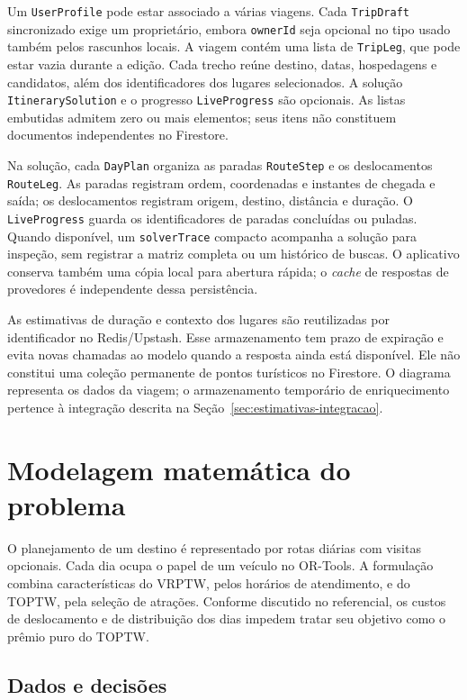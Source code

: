 Um \texttt{UserProfile} pode estar associado a várias viagens. Cada \texttt{TripDraft} sincronizado exige um proprietário, embora \texttt{ownerId} seja opcional no tipo usado também pelos rascunhos locais. A viagem contém uma lista de \texttt{TripLeg}, que pode estar vazia durante a edição. Cada trecho reúne destino, datas, hospedagens e candidatos, além dos identificadores dos lugares selecionados. A solução \texttt{ItinerarySolution} e o progresso \texttt{LiveProgress} são opcionais. As listas embutidas admitem zero ou mais elementos; seus itens não constituem documentos independentes no Firestore.

Na solução, cada \texttt{DayPlan} organiza as paradas \texttt{RouteStep} e os deslocamentos \texttt{RouteLeg}. As paradas registram ordem, coordenadas e instantes de chegada e saída; os deslocamentos registram origem, destino, distância e duração. O \texttt{LiveProgress} guarda os identificadores de paradas concluídas ou puladas. Quando disponível, um \texttt{solverTrace} compacto acompanha a solução para inspeção, sem registrar a matriz completa ou um histórico de buscas. O aplicativo conserva também uma cópia local para abertura rápida; o \textit{cache} de respostas de provedores é independente dessa persistência.

As estimativas de duração e contexto dos lugares são reutilizadas por identificador no Redis/Upstash. Esse armazenamento tem prazo de expiração e evita novas chamadas ao modelo quando a resposta ainda está disponível. Ele não constitui uma coleção permanente de pontos turísticos no Firestore. O diagrama representa os dados da viagem; o armazenamento temporário de enriquecimento pertence à integração descrita na Seção~\ref{sec:estimativas-integracao}.

\section{Modelagem matemática do problema}
\label{sec:modelagem-matematica}

O planejamento de um destino é representado por rotas diárias com visitas opcionais. Cada dia ocupa o papel de um veículo no OR-Tools. A formulação combina características do VRPTW, pelos horários de atendimento, e do TOPTW, pela seleção de atrações. Conforme discutido no referencial, os custos de deslocamento e de distribuição dos dias impedem tratar seu objetivo como o prêmio puro do TOPTW.

\subsection*{Dados e decisões}

